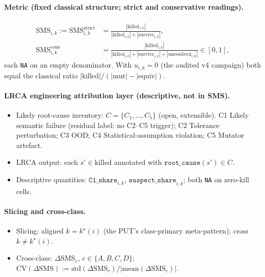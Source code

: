 \documentclass[manuscript,screen,review]{acmart}
\begin{document}
\paragraph{Metric (fixed classical structure; strict and conservative readings).}
\begin{align*}
\mathrm{SMS}_{i,k} := \mathrm{SMS}^{\mathrm{strict}}_{i,k} &= \frac{|\mathrm{killed}_{i,k}|}{|\mathrm{killed}_{i,k}| + |\mathrm{survive}_{i,k}|}, \\
\mathrm{SMS}^{\mathrm{cons}}_{i,k} &= \frac{|\mathrm{killed}_{i,k}|}{|\mathrm{killed}_{i,k}| + |\mathrm{survive}_{i,k}| + |\mathrm{unresolved}_{i,k}|} \in [0, 1],
\end{align*}
each \texttt{NA} on an empty denominator. With $u_{i,k} = 0$ (the
audited v4 campaign) both equal the classical ratio
$|\mathrm{killed}|/(|\mathrm{mut}| - |\mathrm{equiv}|)$.

\paragraph{LRCA engineering attribution layer (descriptive, not in SMS).}
\begin{itemize}
\item Likely root-cause inventory: $C = \{C_1, \ldots, C_5\}$ (open, extensible). C1 Likely semantic failure (residual label: no C2--C5 trigger); C2 Tolerance perturbation; C3 OOD; C4 Statistical-assumption violation; C5 Mutator artefact.
\item LRCA output: each $s' \in \mathrm{killed}$ annotated with $\texttt{root\_cause}(s') \in C$.
\item Descriptive quantities: $\texttt{C1\_share}_{i,k}$, $\texttt{suspect\_share}_{i,k}$; both \texttt{NA} on zero-kill cells.
\end{itemize}

\paragraph{Slicing and cross-class.}
\begin{itemize}
\item Slicing: aligned $k = k^\star(i)$ (the PUT's class-primary meta-pattern); cross $k \neq k^\star(i)$.
\item Cross-class: $\Delta\mathrm{SMS}_c$, $c \in \{A, B, C, D\}$; $\mathrm{CV}(\Delta\mathrm{SMS}) := \mathrm{std}(\Delta\mathrm{SMS}_c) / |\mathrm{mean}(\Delta\mathrm{SMS}_c)|$.
\end{itemize}
\end{document}
